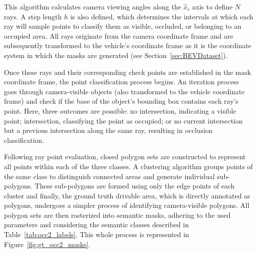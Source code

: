 This algorithm calculates camera viewing angles along the $\hat{x}_c$ axis to define $N$ rays. A step length $h$ is also defined, which determines the intervals at which each ray will sample points to classify them as visible, occluded, or belonging to an occupied area. All rays originate from the camera coordinate frame and are subsequently transformed to the vehicle's coordinate frame as it is the coordinate system in which the  masks are generated (see Section~\ref{sec:BEVDataset}).

Once these rays and their corresponding check points are established in the  mask coordinate frame, the point classification process begins. An iteration process goes through camera-visible objects (also transformed to the vehicle coordinate frame) and check if the base of the object's bounding box contains each ray's point. Here, three outcomes are possible: no intersection, indicating a visible point; intersection, classifying the point as occupied; or no current intersection but a previous intersection along the same ray, resulting in occlusion classification.


Following ray point evaluation, closed polygon sets are constructed to represent all points within each of the three classes. A clustering algorithm groups points of the same class to distinguish connected areas and generate individual sub-polygons. These sub-polygons are formed using only the edge points of each cluster and finally, the ground truth drivable area, which is directly annotated as polygons, undergoes a simpler process of identifying camera-visible polygons. All polygon sets are then rasterized into semantic masks, adhering to the used  parameters and considering the semantic classes described in Table~\ref{tab:occ2_labels}. This whole process is represented in Figure~\ref{fig:gt_occ2_masks}.  


